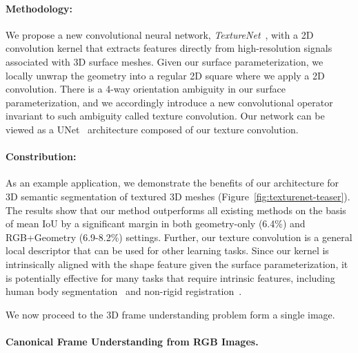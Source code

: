 \paragraph*{Methodology:} We propose a new convolutional neural network, \emph{TextureNet}~\cite{huang2018texturenet}, with a 2D convolution kernel that extracts features directly from high-resolution signals associated with 3D surface meshes.  Given our surface parameterization, we locally unwrap the geometry into a regular 2D square where we apply a 2D convolution. There is a 4-way orientation ambiguity in our surface parameterization, and we accordingly introduce a new convolutional operator invariant to such ambiguity called texture convolution. Our network can be viewed as a UNet~\cite{ronneberger2015u} architecture composed of our texture convolution.

\paragraph*{Constribution:} As an example application, we demonstrate the benefits of our architecture for 3D semantic segmentation of textured 3D meshes (Figure~\ref{fig:texturenet-teaser}).  The results show that our method outperforms all existing methods on the basis of mean IoU by a significant margin in both geometry-only (6.4\%) and RGB+Geometry (6.9-8.2\%) settings. Further, our texture convolution is a general local descriptor that can be used for other learning tasks. Since our kernel is intrinsically aligned with the shape feature given the surface parameterization, it is potentially effective for many tasks that require intrinsic features, including human body segmentation~\cite{maron2017convolutional} and non-rigid registration~\cite{litany2017deep}.

\vspace*{10pt}\noindent We now proceed to the 3D frame understanding problem form a single image.

\paragraph*{Canonical Frame Understanding from RGB Images.}
\label{intro:frame}

